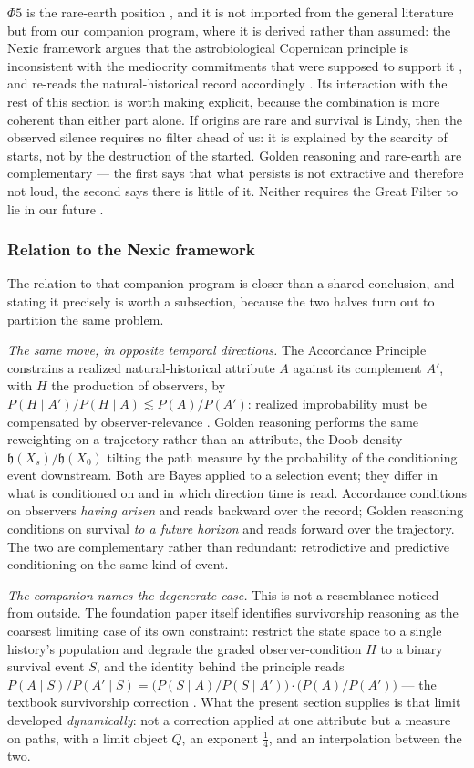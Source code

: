 \documentclass[11pt]{article}
\numberwithin{equation}{section}
\theoremstyle{plain}
\theoremstyle{definition}
\theoremstyle{remark}
\newcommand{\hm}{\mathfrak{h}}
\begin{document}
$\Phi5$ is the rare-earth position \cite{WB00}, and it is not imported
from the general literature but from our companion program,
where it is derived rather than assumed: the Nexic framework
\cite{Nexus} argues that the astrobiological Copernican principle
is inconsistent with the mediocrity commitments that were supposed to
support it \cite{Ben26Found}, and re-reads the natural-historical record
accordingly \cite{Ben26Optimal}. Its interaction with the rest of this
section is worth making explicit, because the combination is more
coherent than either part alone. If origins are rare and survival is
Lindy, then the observed silence requires no filter ahead of us: it is
explained by the scarcity of starts, not by the destruction of the
started. Golden reasoning and rare-earth are complementary --- the first
says that what persists is not extractive and therefore not loud, the
second says there is little of it. Neither requires the Great Filter to
lie in our future \cite{Han98,SDO18}.

\subsubsection{Relation to the Nexic framework}
\label{gr:subsub:nexic}

The relation to that companion program is closer than a shared
conclusion, and stating it precisely is worth a subsection, because the
two halves turn out to partition the same problem.

\emph{The same move, in opposite temporal directions.} The Accordance
Principle constrains a realized natural-historical attribute $A$ against
its complement $A'$, with $H$ the production of observers, by
$P(H\mid A')/P(H\mid A)\lesssim P(A)/P(A')$: realized improbability must
be compensated by observer-relevance \cite{Ben26Found}. Golden reasoning
performs the same reweighting on a trajectory rather than an attribute,
the Doob density $\hm(X_s)/\hm(X_0)$ tilting the path measure by the
probability of the conditioning event downstream. Both are Bayes applied
to a selection event; they differ in what is conditioned on and in which
direction time is read. Accordance conditions on observers \emph{having
arisen} and reads backward over the record; Golden reasoning conditions
on survival \emph{to a future horizon} and reads forward over the
trajectory. The two are complementary rather than redundant:
retrodictive and predictive conditioning on the same kind of event.

\emph{The companion names the degenerate case.} This is not a
resemblance noticed from outside. The foundation paper itself identifies
survivorship reasoning as the coarsest limiting case of its own
constraint: restrict the state space to a single history's population
and degrade the graded observer-condition $H$ to a binary survival event
$S$, and the identity behind the principle reads
$P(A\mid S)/P(A'\mid S) = \bigl(P(S\mid A)/P(S\mid A')\bigr)\cdot
\bigl(P(A)/P(A')\bigr)$ --- the textbook survivorship correction
\cite{Ben26Found}. What the present section supplies is that limit
developed \emph{dynamically}: not a correction applied at one attribute
but a measure on paths, with a limit object $Q$, an exponent
$\tfrac14$, and an interpolation between the two.
\end{document}
